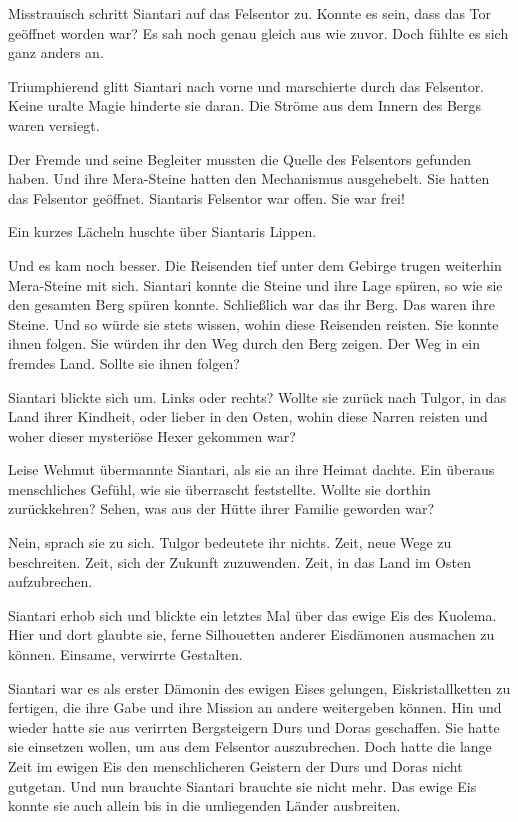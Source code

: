 Misstrauisch schritt Siantari auf das Felsentor zu. Konnte es sein, dass das Tor geöffnet worden war? Es sah noch genau gleich aus wie zuvor. Doch fühlte es sich ganz anders an.

Triumphierend glitt Siantari nach vorne und marschierte durch das Felsentor. Keine uralte Magie hinderte sie daran. Die Ströme aus dem Innern des Bergs waren versiegt.

Der Fremde und seine Begleiter mussten die Quelle des Felsentors gefunden haben. Und ihre Mera-Steine hatten den Mechanismus ausgehebelt. Sie hatten das Felsentor geöffnet. Siantaris Felsentor war offen. Sie war frei!

Ein kurzes Lächeln huschte über Siantaris Lippen.

Und es kam noch besser. Die Reisenden tief unter dem Gebirge trugen weiterhin Mera-Steine mit sich. Siantari konnte die Steine und ihre Lage spüren, so wie sie den gesamten Berg spüren konnte. Schließlich war das ihr Berg. Das waren ihre Steine. Und so würde sie stets wissen, wohin diese Reisenden reisten. Sie konnte ihnen folgen. Sie würden ihr den Weg durch den Berg zeigen. Der Weg in ein fremdes Land. Sollte sie ihnen folgen?

Siantari blickte sich um. Links oder rechts? Wollte sie zurück nach Tulgor, in das Land ihrer Kindheit, oder lieber in den Osten, wohin diese Narren reisten und woher dieser mysteriöse Hexer gekommen war?

Leise Wehmut übermannte Siantari, als sie an ihre Heimat dachte. Ein überaus menschliches Gefühl, wie sie überrascht feststellte. Wollte sie dorthin zurückkehren? Sehen, was aus der Hütte ihrer Familie geworden war?

Nein, sprach sie zu sich. Tulgor bedeutete ihr nichts. Zeit, neue Wege zu beschreiten. Zeit, sich der Zukunft zuzuwenden. Zeit, in das Land im Osten aufzubrechen.

Siantari erhob sich und blickte ein letztes Mal über das ewige Eis des Kuolema. Hier und dort glaubte sie, ferne Silhouetten anderer Eisdämonen ausmachen zu können. Einsame, verwirrte Gestalten.

Siantari war es als erster Dämonin des ewigen Eises gelungen, Eiskristallketten zu fertigen, die ihre Gabe und ihre Mission an andere weitergeben können. Hin und wieder hatte sie aus verirrten Bergsteigern Durs und Doras geschaffen. Sie hatte sie einsetzen wollen, um aus dem Felsentor auszubrechen. Doch hatte die lange Zeit im ewigen Eis den menschlicheren Geistern der Durs und Doras nicht gutgetan. Und nun brauchte Siantari brauchte sie nicht mehr. Das ewige Eis konnte sie auch allein bis in die umliegenden Länder ausbreiten.

